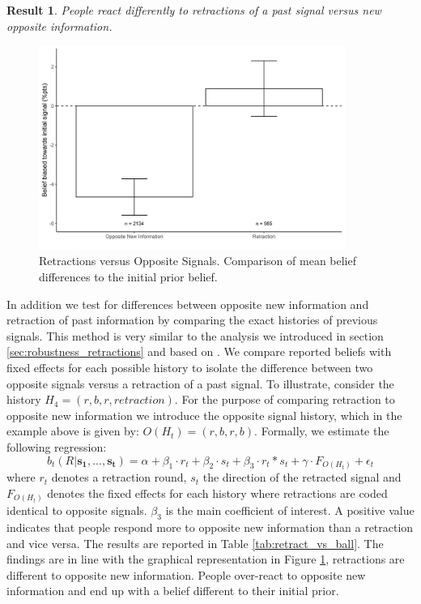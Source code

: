 \documentclass{article}
\newtheorem{result}{Result}
\newenvironment{Result}{\begin{result} \rm }{\end{result}}
\begin{document}
\begin{Result}
    People react differently to retractions of a past signal versus new opposite information.
\end{Result}

\begin{figure}
    \centering
    \includegraphics[width=10cm]{Fig/02_fig_retract_diff_vs_opposite_ball_all.jpg}
    \caption{Retractions versus Opposite Signals. Comparison of mean belief differences to the initial prior belief.}
    \label{fig:retract_vs_opposite}
\end{figure}

In addition we test for differences between opposite new information and retraction of past information by comparing the exact histories of previous signals. This method is very similar to the analysis we introduced in section \ref{sec:robustness_retractions} and based on \cite{Goncalves2022}. We compare reported beliefs with fixed effects for each possible history to isolate the difference between two opposite signals versus a retraction of a past signal. To illustrate, consider the history $H_4=(r,b,r,retraction)$. For the purpose of comparing retraction to opposite new information we introduce the opposite signal history, which in the example above is given by: $O(H_t)=(r,b,r,b)$. Formally, we estimate the following regression:
\begin{equation}
    b_t(R|\mathbf{s_1},...,\mathbf{s_t})=\alpha + \beta_1 \cdot r_t + \beta_2 \cdot s_t + \beta_3 \cdot r_t*s_t + \gamma \cdot F_{O(H_t)} + \epsilon_t
\end{equation}
where $r_t$ denotes a retraction round, $s_t$ the direction of the retracted signal and $F_{O(H_t)}$ denotes the fixed effects for each history where retractions are coded identical to opposite signals. $\beta_3$ is the main coefficient of interest. A positive value indicates that people respond more to opposite new information than a retraction and vice versa. The results are reported in Table \ref{tab:retract_vs_ball}. The findings are in line with the graphical representation in Figure \ref{fig:retract_vs_opposite}, retractions are different to opposite new information. People over-react to opposite new information and end up with a belief different to their initial prior.
\end{document}
